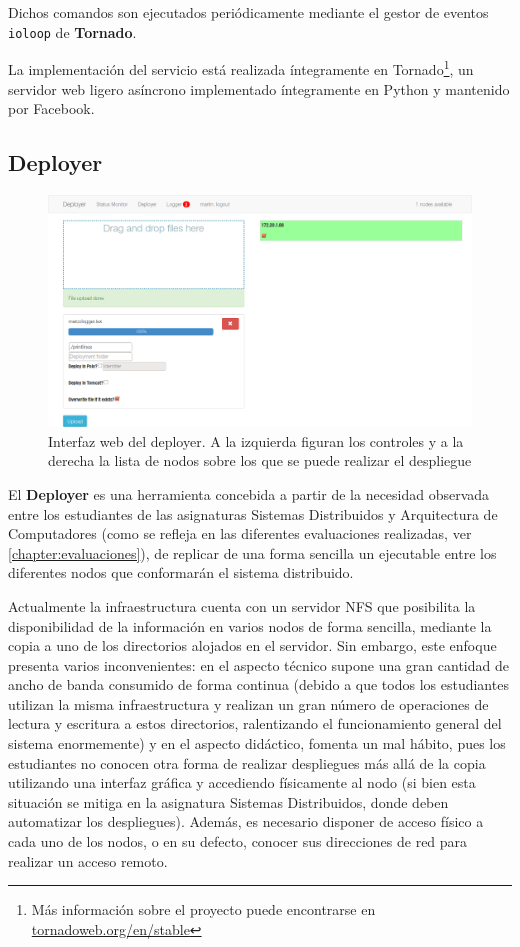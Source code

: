 Dichos comandos son ejecutados periódicamente mediante el gestor de eventos \texttt{ioloop} de \textbf{Tornado}.

La implementación del servicio está realizada íntegramente en Tornado\footnote{Más información sobre el proyecto puede encontrarse en \href{http://www.tornadoweb.org/en/stable/}{tornadoweb.org/en/stable}}, un servidor web ligero asíncrono implementado íntegramente en Python y mantenido por Facebook.

\subsection{Deployer}
\label{deployer}
\begin{figure}[H]
\centering
\includegraphics[height=0.3\textheight]{Chapters/Chapter5/Figures/screenshot-deployer}
\caption[Interfaz web del deployer]{Interfaz web del deployer. A la izquierda figuran los controles y a la derecha la lista de nodos sobre los que se puede realizar el despliegue}
\label{fig:vista_deployer}
\end{figure}

El \textbf{Deployer} es una herramienta concebida a partir de la necesidad observada entre los estudiantes de las asignaturas Sistemas Distribuidos y Arquitectura de Computadores (como se refleja en las diferentes evaluaciones realizadas, ver \ref{chapter:evaluaciones}), de replicar de una forma sencilla un ejecutable entre los diferentes nodos que conformarán el sistema distribuido.

Actualmente la infraestructura cuenta con un servidor NFS que posibilita la disponibilidad de la información en varios nodos de forma sencilla, mediante la copia a uno de los directorios alojados en el servidor. Sin embargo, este enfoque presenta varios inconvenientes: en el aspecto técnico supone una gran cantidad de ancho de banda consumido de forma continua (debido a que todos los estudiantes utilizan la misma infraestructura y realizan un gran número de operaciones de lectura y escritura a estos directorios, ralentizando el funcionamiento general del sistema enormemente) y en el aspecto didáctico, fomenta un mal hábito, pues los estudiantes no conocen otra forma de realizar despliegues más allá de la copia utilizando una interfaz gráfica y accediendo físicamente al nodo (si bien esta situación se mitiga en la asignatura Sistemas Distribuidos, donde deben automatizar los despliegues). Además, es necesario disponer de acceso físico a cada uno de los nodos, o en su defecto, conocer sus direcciones de red para realizar un acceso remoto.

